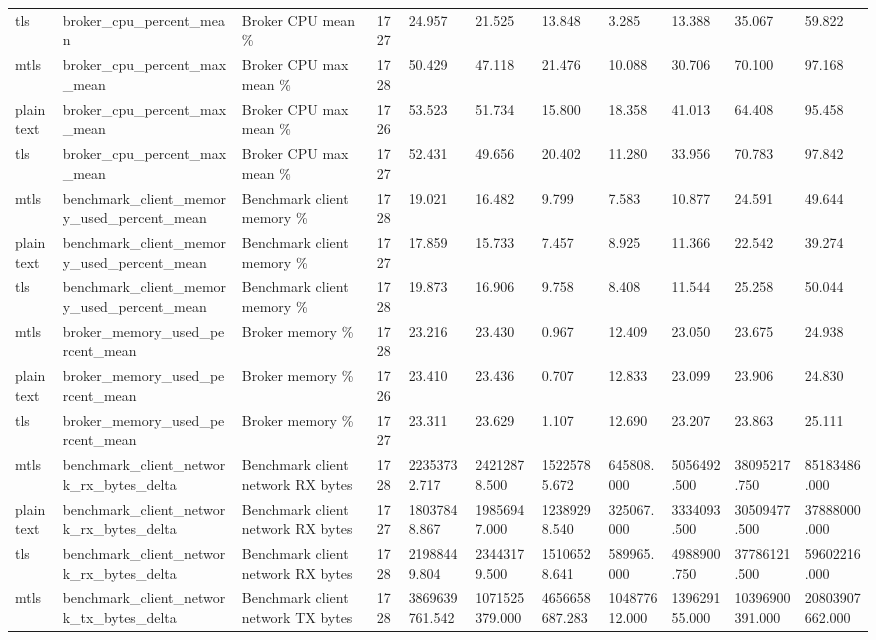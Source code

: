 \begin{longtable}{lllllllllll}
tls & broker\_cpu\_percent\_mean & Broker CPU mean \% & 1727 & 24.957 & 21.525 & 13.848 & 3.285 & 13.388 & 35.067 & 59.822 \\
mtls & broker\_cpu\_percent\_max\_mean & Broker CPU max mean \% & 1728 & 50.429 & 47.118 & 21.476 & 10.088 & 30.706 & 70.100 & 97.168 \\
plaintext & broker\_cpu\_percent\_max\_mean & Broker CPU max mean \% & 1726 & 53.523 & 51.734 & 15.800 & 18.358 & 41.013 & 64.408 & 95.458 \\
tls & broker\_cpu\_percent\_max\_mean & Broker CPU max mean \% & 1727 & 52.431 & 49.656 & 20.402 & 11.280 & 33.956 & 70.783 & 97.842 \\
mtls & benchmark\_client\_memory\_used\_percent\_mean & Benchmark client memory \% & 1728 & 19.021 & 16.482 & 9.799 & 7.583 & 10.877 & 24.591 & 49.644 \\
plaintext & benchmark\_client\_memory\_used\_percent\_mean & Benchmark client memory \% & 1727 & 17.859 & 15.733 & 7.457 & 8.925 & 11.366 & 22.542 & 39.274 \\
tls & benchmark\_client\_memory\_used\_percent\_mean & Benchmark client memory \% & 1728 & 19.873 & 16.906 & 9.758 & 8.408 & 11.544 & 25.258 & 50.044 \\
mtls & broker\_memory\_used\_percent\_mean & Broker memory \% & 1728 & 23.216 & 23.430 & 0.967 & 12.409 & 23.050 & 23.675 & 24.938 \\
plaintext & broker\_memory\_used\_percent\_mean & Broker memory \% & 1726 & 23.410 & 23.436 & 0.707 & 12.833 & 23.099 & 23.906 & 24.830 \\
tls & broker\_memory\_used\_percent\_mean & Broker memory \% & 1727 & 23.311 & 23.629 & 1.107 & 12.690 & 23.207 & 23.863 & 25.111 \\
mtls & benchmark\_client\_network\_rx\_bytes\_delta & Benchmark client network RX bytes & 1728 & 22353732.717 & 24212878.500 & 15225785.672 & 645808.000 & 5056492.500 & 38095217.750 & 85183486.000 \\
plaintext & benchmark\_client\_network\_rx\_bytes\_delta & Benchmark client network RX bytes & 1727 & 18037848.867 & 19856947.000 & 12389298.540 & 325067.000 & 3334093.500 & 30509477.500 & 37888000.000 \\
tls & benchmark\_client\_network\_rx\_bytes\_delta & Benchmark client network RX bytes & 1728 & 21988449.804 & 23443179.500 & 15106528.641 & 589965.000 & 4988900.750 & 37786121.500 & 59602216.000 \\
mtls & benchmark\_client\_network\_tx\_bytes\_delta & Benchmark client network TX bytes & 1728 & 3869639761.542 & 1071525379.000 & 4656658687.283 & 104877612.000 & 139629155.000 & 10396900391.000 & 20803907662.000 \\

\end{longtable}

